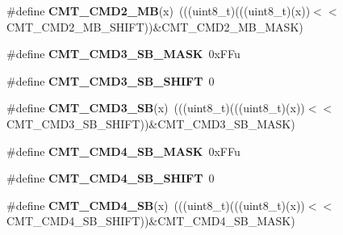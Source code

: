 \begin{DoxyCompactItemize}
\item 
\#define {\bfseries C\+M\+T\+\_\+\+C\+M\+D2\+\_\+\+MB}(x)~(((uint8\+\_\+t)(((uint8\+\_\+t)(x))$<$$<$C\+M\+T\+\_\+\+C\+M\+D2\+\_\+\+M\+B\+\_\+\+S\+H\+I\+FT))\&C\+M\+T\+\_\+\+C\+M\+D2\+\_\+\+M\+B\+\_\+\+M\+A\+SK)\hypertarget{group__CMT__Register__Masks_ga87471234abbe07360747af94e8ac2bf0}{}\label{group__CMT__Register__Masks_ga87471234abbe07360747af94e8ac2bf0}

\item 
\#define {\bfseries C\+M\+T\+\_\+\+C\+M\+D3\+\_\+\+S\+B\+\_\+\+M\+A\+SK}~0x\+F\+Fu\hypertarget{group__CMT__Register__Masks_ga0ee814da2957c935fad8b236d52b22f5}{}\label{group__CMT__Register__Masks_ga0ee814da2957c935fad8b236d52b22f5}

\item 
\#define {\bfseries C\+M\+T\+\_\+\+C\+M\+D3\+\_\+\+S\+B\+\_\+\+S\+H\+I\+FT}~0\hypertarget{group__CMT__Register__Masks_ga87210814a860e3ea66f06747156fbd9a}{}\label{group__CMT__Register__Masks_ga87210814a860e3ea66f06747156fbd9a}

\item 
\#define {\bfseries C\+M\+T\+\_\+\+C\+M\+D3\+\_\+\+SB}(x)~(((uint8\+\_\+t)(((uint8\+\_\+t)(x))$<$$<$C\+M\+T\+\_\+\+C\+M\+D3\+\_\+\+S\+B\+\_\+\+S\+H\+I\+FT))\&C\+M\+T\+\_\+\+C\+M\+D3\+\_\+\+S\+B\+\_\+\+M\+A\+SK)\hypertarget{group__CMT__Register__Masks_ga431d80d598dabe4e65e1afb9eb9db574}{}\label{group__CMT__Register__Masks_ga431d80d598dabe4e65e1afb9eb9db574}

\item 
\#define {\bfseries C\+M\+T\+\_\+\+C\+M\+D4\+\_\+\+S\+B\+\_\+\+M\+A\+SK}~0x\+F\+Fu\hypertarget{group__CMT__Register__Masks_ga634397e39fb458afba9c0cfefdfc36d8}{}\label{group__CMT__Register__Masks_ga634397e39fb458afba9c0cfefdfc36d8}

\item 
\#define {\bfseries C\+M\+T\+\_\+\+C\+M\+D4\+\_\+\+S\+B\+\_\+\+S\+H\+I\+FT}~0\hypertarget{group__CMT__Register__Masks_gac4d14f573bc993ac68f7cc9242fbe888}{}\label{group__CMT__Register__Masks_gac4d14f573bc993ac68f7cc9242fbe888}

\item 
\#define {\bfseries C\+M\+T\+\_\+\+C\+M\+D4\+\_\+\+SB}(x)~(((uint8\+\_\+t)(((uint8\+\_\+t)(x))$<$$<$C\+M\+T\+\_\+\+C\+M\+D4\+\_\+\+S\+B\+\_\+\+S\+H\+I\+FT))\&C\+M\+T\+\_\+\+C\+M\+D4\+\_\+\+S\+B\+\_\+\+M\+A\+SK)\hypertarget{group__CMT__Register__Masks_gab29afd8c13712224b175b9ea866463ba}{}\label{group__CMT__Register__Masks_gab29afd8c13712224b175b9ea866463ba}


\end{DoxyCompactItemize}
